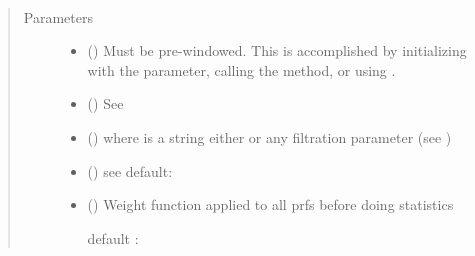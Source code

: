 \documentclass[letterpaper,10pt,openany,oneside,english]{sphinxmanual}
\begin{document}

\begin{fulllineitems}
\label{\detokenize{prfstats:prfstats.pairwise_mean_dists}}~\begin{quote}\begin{description}
\item[{Parameters}] \leavevmode\begin{itemize}
\item {} 
 ({\hyperref[\detokenize{signals:signals.Trajectory}]{}}) \textendash{} Must be pre-windowed. This is accomplished by initializing with the
 parameter, calling the  method, or using
.

\item {} 
 () \textendash{} See {\hyperref[\detokenize{phomology:phomology.build_filtration.build_filtration}]{}}

\item {} 
 () \textendash{}  where  is a string \textendash{} either
 or any filtration parameter
(see )

\item {} 
 (\sphinxstyleliteralemphasis{, }) \textendash{} see 
default: 

\item {} 
 (\sphinxstyleliteralemphasis{, }) \textendash{} 
Weight function applied to all prfs before doing statistics

default : 



\end{itemize}
\end{description}
\end{quote}
\end{fulllineitems}
\end{document}
